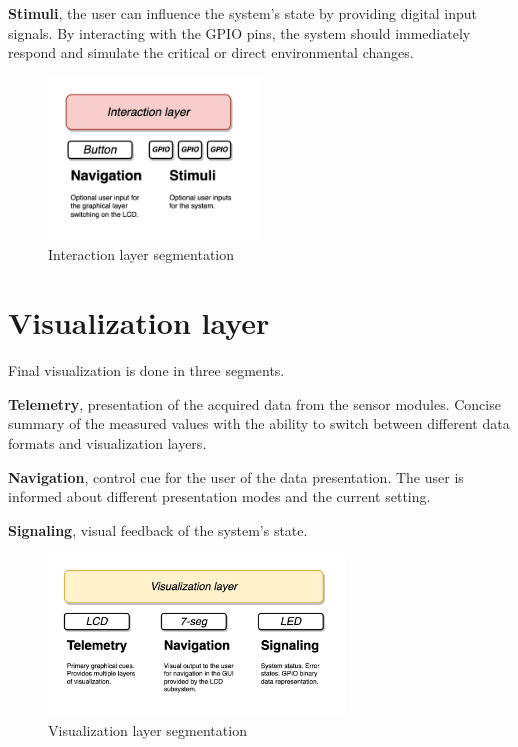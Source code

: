 \textbf{Stimuli}, the user can influence the system's state by providing digital input signals.
By interacting with the GPIO pins, the system should immediately respond and simulate the critical or direct
environmental changes.

\begin{figure}[h]
    \centering
    \includegraphics[width=0.5\textwidth]{images/interaction.drawio}
    \caption{Interaction layer segmentation}\label{fig:figure-interaction}
\end{figure}

\section{Visualization layer}\label{sec:gui}

Final visualization is done in three segments.

\textbf{Telemetry}, presentation of the acquired data from the sensor modules.
Concise summary of the measured values with the ability to switch between different data formats and
visualization layers.

\textbf{Navigation}, control cue for the user of the data presentation.
The user is informed about different presentation modes and the current setting.

\textbf{Signaling}, visual feedback of the system's state.

\begin{figure}[h]
    \centering
    \includegraphics[width=0.7\textwidth]{images/visualization.drawio}
    \caption{Visualization layer segmentation}\label{fig:figure-gui}
\end{figure}
